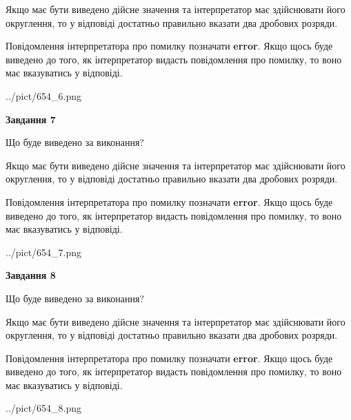 \documentclass[12pt, ukrainian]{article}
\begin{document}
{\begin {Large}
Якщо має бути виведено дійсне значення та інтерпретатор має здійснювати його округлення, 
то у відповіді достатньо правильно вказати два дробових розряди.

Повідомлення інтерпретатора про помилку позначати \textbf{error}.
Якщо щось буде виведено до того, як інтерпретатор видасть повідомлення про помилку, 
то воно має вказуватись у відповіді. \par

\begin{center}
	{../pict/654_6.png}
\end{center}
\newpage

{\begin {center}\textbf{Завдання 7}\end {center}}\par
Що буде виведено за виконання? \par

Якщо має бути виведено дійсне значення та інтерпретатор має здійснювати його округлення, 
то у відповіді достатньо правильно вказати два дробових розряди.

Повідомлення інтерпретатора про помилку позначати \textbf{error}.
Якщо щось буде виведено до того, як інтерпретатор видасть повідомлення про помилку, 
то воно має вказуватись у відповіді. \par

\begin{center}
	{../pict/654_7.png}
\end{center}
\newpage

{\begin {center}\textbf{Завдання 8}\end {center}}\par
Що буде виведено за виконання? \par

Якщо має бути виведено дійсне значення та інтерпретатор має здійснювати його округлення, 
то у відповіді достатньо правильно вказати два дробових розряди.

Повідомлення інтерпретатора про помилку позначати \textbf{error}.
Якщо щось буде виведено до того, як інтерпретатор видасть повідомлення про помилку, 
то воно має вказуватись у відповіді. \par

\begin{center}
	{../pict/654_8.png}
\end{center}
\newpage


\end{Large}}
\end{document}
